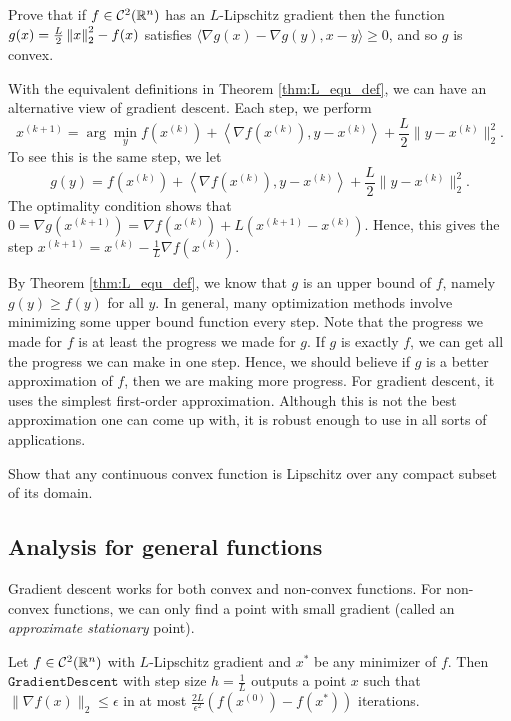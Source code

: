 \begin{xca}
Prove that if $f\in{\cal C}^{2}(\mathbb{R}^{n})$ has an $L$-Lipschitz gradient
then the function $g(x)=\frac{L}{2}\left\Vert x\right\Vert^{2}_{2}-f(x)$ satisfies
$\langle\nabla g(x)-\nabla g(y),x-y\rangle\ge0$, and so $g$ is convex.
\end{xca}

With the equivalent definitions in Theorem \ref{thm:L_equ_def}, we
can have an alternative view of gradient descent. Each step, we perform
\[
x^{(k+1)}=\arg\min_{y}f(x^{(k)})+\left\langle \nabla f(x^{(k)}),y-x^{(k)}\right\rangle +\frac{L}{2}\|y-x^{(k)}\|^{2}_{2}.
\]
To see this is the same step, we let 
\[
g(y)=f(x^{(k)})+\left\langle \nabla f(x^{(k)}),y-x^{(k)}\right\rangle +\frac{L}{2}\|y-x^{(k)}\|^{2}_{2}.
\]
The optimality condition shows that $0=\nabla g(x^{(k+1)})=\nabla f(x^{(k)})+L(x^{(k+1)}-x^{(k)})$.
Hence, this gives the step $x^{(k+1)}=x^{(k)}-\frac{1}{L}\nabla f(x^{(k)})$.

By Theorem \ref{thm:L_equ_def}, we know that $g$ is an upper bound
of $f$, namely $g(y)\geq f(y)$ for all $y$. In general, many optimization
methods involve minimizing some upper bound function every step. Note
that the progress we made for $f$ is at least the progress we made
for $g$. If $g$ is exactly $f$, we can get all the progress we
can make in one step. Hence, we should believe if $g$ is a better
approximation of $f$, then we are making more progress. For gradient
descent, it uses the simplest first-order approximation. Although
this is not the best approximation one can come up with, it is robust
enough to use in all sorts of applications.
\begin{xca}
Show that any continuous convex function is Lipschitz over any compact
subset of its domain.
\end{xca}


\subsection{Analysis for general functions}

Gradient descent works for both convex and non-convex functions. For
non-convex functions, we can only find a point with small gradient
(called an \emph{approximate stationary} point).
\begin{thm}
\label{thm:gd_general}Let $f\in\mathcal{C}^{2}(\mathbb{R}^{n})$ with $L$-Lipschitz
gradient and $x^{*}$ be any minimizer of $f$. Then $\mathtt{GradientDescent}$
with step size $h=\frac{1}{L}$ outputs a point $x$ such that $\|\nabla f(x)\|_{2}\leq\epsilon$
in at most $\frac{2L}{\epsilon^{2}}\left(f(x^{(0)})-f(x^{*})\right)$
iterations.
\end{thm}

